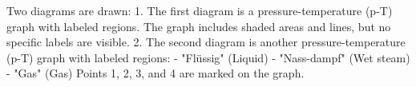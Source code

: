Two diagrams are drawn:  
1. The first diagram is a pressure-temperature (p-T) graph with labeled regions. The graph includes shaded areas and lines, but no specific labels are visible.  
2. The second diagram is another pressure-temperature (p-T) graph with labeled regions:  
   - "Flüssig" (Liquid)  
   - "Nass-dampf" (Wet steam)  
   - "Gas" (Gas)  
   Points 1, 2, 3, and 4 are marked on the graph.